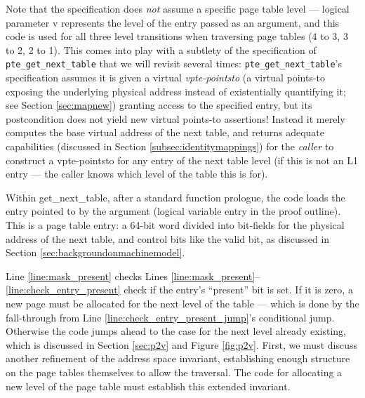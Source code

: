 Note that the specification does \emph{not} assume a specific page table level --- logical parameter \textsf{v} represents the level
of the entry passed as an argument, and this code
is used for all three level transitions when traversing page tables (4 to 3, 3 to 2, 2 to 1).
This comes into play with a subtlety of the specification of \lstinline|pte_get_next_table| that we will
revisit several times: \lstinline|pte_get_next_table|'s specification
assumes it is given a virtual \emph{vpte-pointsto}
(a virtual points-to exposing the underlying physical address instead of existentially quantifying it;
 see Section \ref{sec:mapnew}) granting access to the specified entry,
but its postcondition does not yield new virtual points-to assertions!
Instead it merely computes the base virtual address of the next table, and returns adequate capabilities (discussed in Section \ref{subsec:identitymappings})
for the \emph{caller} to construct a vpte-pointsto for any entry of the next table level (if this is not an L1 entry ---
the caller knows which level of the table this is for).

Within \textsf{get\_next\_table}, after a standard function prologue, the code 
loads the entry pointed to by the argument (logical variable \textsf{entry} in the proof outline).
This is a page table entry: a 64-bit word divided into bit-fields for
the physical address of the next table, and control bits like the valid bit, as discussed in 
Section \ref{sec:backgroundonmachinemodel}.



\ifPLDI
Line \ref{line:mask_present} checks %
\else
Lines \ref{line:mask_present}--\ref{line:check_entry_present} check
\fi
if the entry's ``present'' bit is set.
If it is zero, a new page must be allocated for the next level of the table --- which is done by the fall-through
from Line \ref{line:check_entry_present_jump}'s conditional jump. Otherwise the code jumps ahead to
the case for the next level already existing, which is discussed in Section \ref{sec:p2v} and Figure \ref{fig:p2v}.
First, we must discuss another refinement of the address space invariant, establishing
enough structure on the page tables themselves to allow the traversal.
The code for allocating a new level of the page table must establish this extended invariant.

